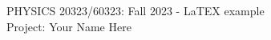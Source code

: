 \documentclass[12pt]{article}
\begin{document}
\def\pos{\medskip\quad}
\def\subpos{\smallskip \qquad}

\begin{center}
{\large
PHYSICS  20323/60323: Fall 2023 - LaTEX example 
}\\
{\large Project: Your Name Here}\\\vskip0.25in
\end{center}



\vskip0.1in
\end{document}
